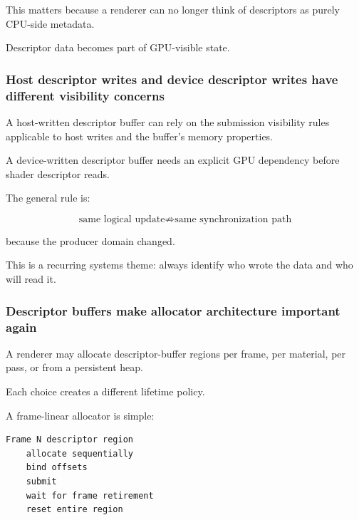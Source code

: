 This matters because a renderer can no longer think of descriptors as purely CPU-side metadata.

Descriptor data becomes part of GPU-visible state.

\subsubsection{Host descriptor writes and device descriptor writes have different visibility concerns}\label{05-engine-i-ch023-host-descriptor-writes-and-device-descriptor-writes-have-different-visibility-concerns}

\hypertarget{05-engine-i-ch023-host-descriptor-writes-and-device-descriptor-writes-have-different-visibility-concerns}{}

A host-written descriptor buffer can rely on the submission visibility rules applicable to host writes and the buffer's memory properties.

A device-written descriptor buffer needs an explicit GPU dependency before shader descriptor reads.

The general rule is:

\[
\boxed{
\text{same logical update}
\not\Rightarrow
\text{same synchronization path}
}
\]

because the producer domain changed.

This is a recurring systems theme: always identify who wrote the data and who will read it.

\subsubsection{Descriptor buffers make allocator architecture important again}\label{05-engine-i-ch023-descriptor-buffers-make-allocator-architecture-important-again}

\hypertarget{05-engine-i-ch023-descriptor-buffers-make-allocator-architecture-important-again}{}

A renderer may allocate descriptor-buffer regions per frame, per material, per pass, or from a persistent heap.

Each choice creates a different lifetime policy.

A frame-linear allocator is simple:

\begin{verbatim}
Frame N descriptor region
    allocate sequentially
    bind offsets
    submit
    wait for frame retirement
    reset entire region
\end{verbatim}

